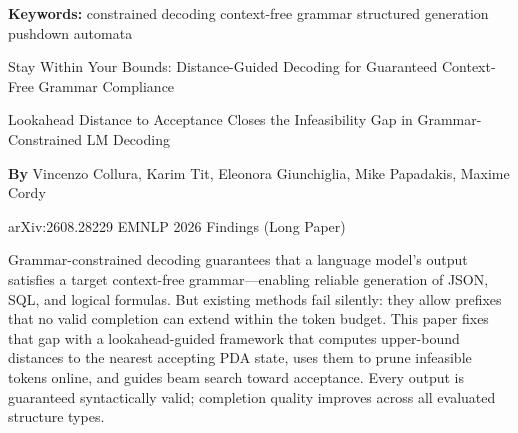 \documentclass[10pt,twocolumn]{article}
\begin{document}
\setlength{\parindent}{0pt}
\setlength{\parskip}{4pt}

{\small\color{keywordgray}\textbf{Keywords:}
  constrained decoding \textbullet{}
  context-free grammar \textbullet{}
  structured generation \textbullet{}
  pushdown automata}\par\vspace{4pt}

{\LARGE\bfseries\raggedright
  Stay Within Your Bounds: Distance-Guided
  Decoding for Guaranteed Context-Free
  Grammar Compliance}\par\vspace{4pt}

{\large\itshape\raggedright
  Lookahead Distance to Acceptance Closes the
  Infeasibility Gap in Grammar-Constrained LM Decoding}\par\vspace{6pt}

{\small\textbf{By} Vincenzo Collura, Karim Tit,
  Eleonora Giunchiglia, Mike Papadakis, Maxime Cordy}\par\vspace{2pt}

{\small\color{keywordgray}arXiv:2608.28229 \textbullet{}
  EMNLP 2026 Findings (Long Paper)}
\par\vspace{2pt}\noindent{\color{rulered}\rule{\columnwidth}{0.6pt}}\vspace{6pt}

Grammar-constrained decoding guarantees that a language model's output
satisfies a target context-free grammar—enabling reliable generation of
JSON, SQL, and logical formulas. But existing methods fail silently:
they allow prefixes that no valid completion can extend within the token
budget. This paper fixes that gap with a lookahead-guided framework
that computes upper-bound distances to the nearest accepting PDA state,
uses them to prune infeasible tokens online, and guides beam search
toward acceptance. Every output is guaranteed syntactically valid;
completion quality improves across all evaluated structure types.
\end{document}
